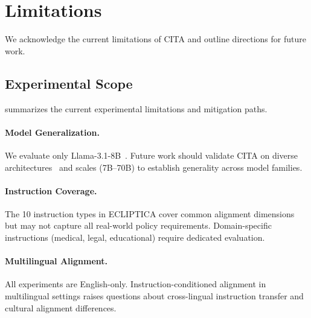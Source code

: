 
\section{Limitations}
\label{sec:limitations}

We acknowledge the current limitations of CITA and outline directions for future work.

\vspace{-2mm}
\subsection{Experimental Scope}
\label{sec:experimental_scope}

\noindent {} summarizes the current experimental limitations and mitigation paths.

\paragraph{Model Generalization.} We evaluate only Llama-3.1-8B~\cite{dubey2024llama}. Future work should validate CITA on diverse architectures~\cite{jiang2023mistral,zhang2022opt,openai2023gpt4} and scales (7B--70B) to establish generality across model families.

\paragraph{Instruction Coverage.} The 10 instruction types in ECLIPTICA cover common alignment dimensions but may not capture all real-world policy requirements. Domain-specific instructions (medical, legal, educational) require dedicated evaluation.

\paragraph{Multilingual Alignment.} All experiments are English-only. Instruction-conditioned alignment in multilingual settings raises questions about cross-lingual instruction transfer and cultural alignment differences.

\vspace{-2mm}

